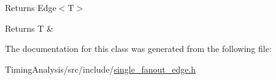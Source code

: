 Returns Edge$<$\-T$>$ 

\begin{DoxyReturn}{Returns}
T \& 
\end{DoxyReturn}


The documentation for this class was generated from the following file\-:\begin{DoxyCompactItemize}
\item 
Timing\-Analysis/src/include/\hyperlink{single__fanout__edge_8h}{single\-\_\-fanout\-\_\-edge.\-h}\end{DoxyCompactItemize}
